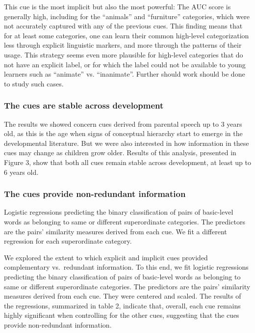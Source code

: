 \documentclass[10pt, letterpaper]{article}
\begin{document}
This cue is the most implicit but also the most powerful: The AUC score
is generally high, including for the ``animals'' and ``furniture''
categories, which were not accurately captured with any of the previous
cues. This finding means that for at least some categories, one can
learn their common high-level categorization less through explicit
linguistic markers, and more through the patterns of their usage. This
strategy seems even more plausible for high-level categories that do not
have an explicit label, or for which the label could not be available to
young learners such as ``animate'' vs. ``inanimate''. Further should
work should be done to study such cases.

\hypertarget{the-cues-are-stable-across-development}{%
\subsubsection{The cues are stable across
development}\label{the-cues-are-stable-across-development}}

The results we showed concern cues derived from parental speech up to 3
years old, as this is the age when signs of conceptual hierarchy start
to emerge in the developmental literature. But we were also interested
in how information in these cues may change as children grow older.
Results of this analysis, presented in Figure 3, show that both all cues
remain stable across development, at least up to 6 years old.

\hypertarget{the-cues-provide-non-redundant-information}{%
\subsubsection{The cues provide non-redundant
information}\label{the-cues-provide-non-redundant-information}}

Logistic regressions predicting the binary classification of pairs of
basic-level words as belonging to same or different superordinate
categories. The predictors are the pairs' similarity measures derived
from each cue. We fit a different regression for each superordinate
category.

We explored the extent to which explicit and implicit cues provided
complementary vs.~redundant information. To this end, we fit logistic
regressions predicting the binary classification of pairs of basic-level
words as belonging to same or different superordinate categories. The
predictors are the pairs' similarity measures derived from each cue.
They were centered and scaled. The results of the regressions,
summarized in table 2, indicate that, overall, each cue remains highly
significant when controlling for the other cues, suggesting that the
cues provide non-redundant information.
\end{document}
